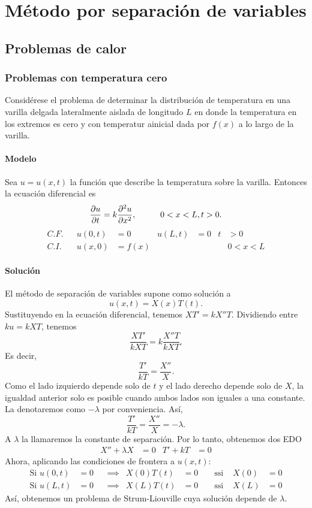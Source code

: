 \documentclass[11pt,letterpaper,draft]{report}
\newcommand\<{\langle}
\renewcommand\>{\rangle}
\begin{document}
\section{Método por separación de variables}

\subsection{Problemas de calor}

\subsubsection{Problemas con temperatura cero}
Considérese el problema de determinar la distribución de
temperatura en una varilla delgada lateralmente aislada de
longitudo $L$ en donde la temperatura en los extremos es cero y
con temperatur ainicial dada por $f(x)$ a lo largo de la varilla.

\paragraph{Modelo}
Sea $u=u(x,t)$ la función que describe la temperatura sobre la
varilla. Entonces la ecuación diferencial es
\[
  \frac{\partial u}{\partial t}
  = k
  \frac{\partial^2 u}{\partial x^2},
  \hspace{10mm} 0<x<L, t>0
.\]
\begin{align*}
  C.F. && u(0,t) &= 0 & u(L,t) &= 0 &t&>0 \\
  C.I. && u(x,0) &= f(x) & &&& 0<x<L
\end{align*}

\paragraph{Solución}
El método de separación de variables supone como solución a
\[
  u(x,t) = X(x)T(t)
.\]
Sustituyendo en la ecuación diferencial, tenemos $XT'=kX''T$.
Dividiendo entre $ku=kXT$, tenemos
\[
  \frac{XT'}{kXT} = k \frac{X''T}{kXT}
.\]
Es decir,
\[
  \frac{T'}{kT} = \frac{X''}{X}
.\]
Como el lado izquierdo depende solo de $t$ y el lado derecho
depende solo de $X$, la igualdad anterior solo es posible cuando
ambos lados son iguales a una constante. La denotaremos como
$-\lambda$ por conveniencia.
Así,
\[
  \frac{T'}{kT} = \frac{X''}{X} = -\lambda
.\]
A $\lambda$ la llamaremos la constante de separación.
Por lo tanto, obtenemos dos EDO
\begin{align*}
  X'' + \lambda X &= 0
  &
  T' + kT &= 0
\end{align*}
Ahora, aplicando las condiciones de frontera a $u(x,t)$:
\begin{align*}
  \text{Si } u(0,t)&=0
  & &\implies &
  X(0)T(t)&=0
  & &\text{ ssi } &
  X(0)&=0 \\
  \text{Si } u(L,t)&=0
  & &\implies &
  X(L)T(t)&=0
  & &\text{ ssi } &
  X(L)&=0
\end{align*}
Así, obtenemos un problema de Strum-Liouville cuya solución
depende de $\lambda$.
\end{document}
